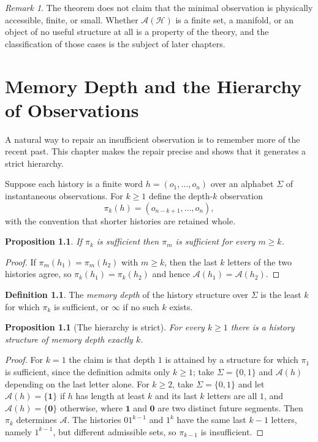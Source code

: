 \documentclass[11pt,oneside]{book}
\newtheorem{proposition}[theorem]{Proposition}
\theoremstyle{definition}
\newtheorem{definition}[theorem]{Definition}
\theoremstyle{remark}
\newtheorem{remark}[theorem]{Remark}
\newcommand{\Hist}{\mathcal{H}}
\newcommand{\Adm}{\mathcal{A}}
\begin{document}
\begin{remark}
The theorem does not claim that the minimal observation is physically accessible, finite, or small. Whether $\Adm(\Hist)$ is a finite set, a manifold, or an object of no useful structure at all is a property of the theory, and the classification of those cases is the subject of later chapters.
\end{remark}

\chapter{Memory Depth and the Hierarchy of Observations}\label{ch:depth}

A natural way to repair an insufficient observation is to remember more of the recent past. This chapter makes the repair precise and shows that it generates a strict hierarchy.

Suppose each history is a finite word $h=(o_1,\dots,o_n)$ over an alphabet $\Sigma$ of instantaneous observations. For $k\ge1$ define the depth-$k$ observation
\[
\pi_k(h)=(o_{n-k+1},\dots,o_n),
\]
with the convention that shorter histories are retained whole.

\begin{proposition}\label{prop:depth-monotone}
If $\pi_k$ is sufficient then $\pi_m$ is sufficient for every $m\ge k$.
\end{proposition}

\begin{proof}
If $\pi_m(h_1)=\pi_m(h_2)$ with $m\ge k$, then the last $k$ letters of the two histories agree, so $\pi_k(h_1)=\pi_k(h_2)$ and hence $\Adm(h_1)=\Adm(h_2)$.
\end{proof}

\begin{definition}
The \emph{memory depth} of the history structure over $\Sigma$ is the least $k$ for which $\pi_k$ is sufficient, or $\infty$ if no such $k$ exists.
\end{definition}

\begin{proposition}[The hierarchy is strict]\label{prop:strict}
For every $k\ge1$ there is a history structure of memory depth exactly $k$.
\end{proposition}

\begin{proof}
For $k=1$ the claim is that depth $1$ is attained by a structure for which $\pi_1$ is sufficient, since the definition admits only $k\ge1$; take $\Sigma=\{0,1\}$ and $\Adm(h)$ depending on the last letter alone. For $k\ge2$, take $\Sigma=\{0,1\}$ and let $\Adm(h)=\{\mathbf 1\}$ if $h$ has length at least $k$ and its last $k$ letters are all $1$, and $\Adm(h)=\{\mathbf 0\}$ otherwise, where $\mathbf 1$ and $\mathbf 0$ are two distinct future segments. Then $\pi_k$ determines $\Adm$. The histories $01^{k-1}$ and $1^{k}$ have the same last $k-1$ letters, namely $1^{k-1}$, but different admissible sets, so $\pi_{k-1}$ is insufficient.
\end{proof}
\end{document}
